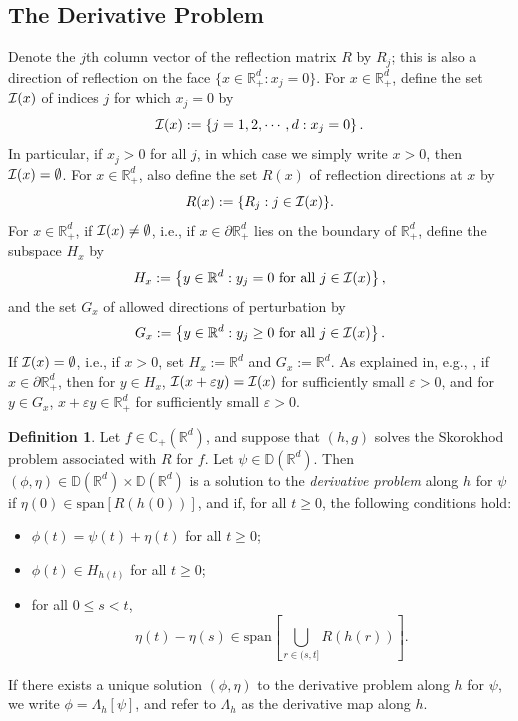 \documentclass[11pt]{article}
\theoremstyle{definition}
\newtheorem{definition}[assumption]{Definition}
\theoremstyle{plain}
\newcommand{\R}{\mathbb{R}}
\newcommand{\C}{\mathbb{C}}
\newcommand{\D}{\mathbb{D}}
\newcommand{\cI}{{\cal I}}
\newcommand{\veps}{\varepsilon}
\begin{document}
\subsection{The Derivative Problem}\label{ssec:deriv-prob}
Denote the $j$th column vector of the reflection matrix $R$ by $R_j$; this is also a direction of reflection on the face $\{x \in \R_+^d : x_j = 0\}$.
For $x \in \R_+^d$, define the set $\cI(x)$ of indices $j$ for which $x_j=0$ by
\begin{equation}
\cI(x) := \left\{j = 1, 2, \cdots, d : x_j = 0\right\}.
\end{equation}
In particular, if $x_j > 0$ for all $j$, in which case we simply write $x>0$, then $\cI(x) = \emptyset$.
For $x \in \R_+^d$, also define the set $R(x)$ of reflection directions at $x$ by
\begin{equation}
R(x) := \{R_j : j \in \cI(x)\}.
\end{equation}
For $x\in \R_+^d$, if $\cI(x) \neq \emptyset$, i.e., if $x \in \partial \R_+^d$ lies on the boundary of $\R_+^d$, 
define the subspace $H_x$ by
\begin{equation}
H_x := \left\{y \in \R^d : y_j = 0 \text{ for all } j \in \cI(x)\right\}, 
\end{equation}
and the set $G_x$ of allowed directions of perturbation by
\begin{equation}
G_x := \left\{y \in \R^d : y_j\geq 0 \text{ for all } j \in \cI(x) \right\}.
\end{equation}
If $\cI(x) = \emptyset$, i.e., if $x > 0$, set $H_x := \R^d$ and $G_x := \R^d$. As explained in, e.g., \cite{LipshutzRamanan2019b}, 
if $x \in \partial \R_+^d$, then for $y \in H_x$, $\cI(x + \veps y) = \cI(x)$ for sufficiently small $\veps>0$, 
and for $y \in G_x$, $x+\veps y \in \R_+^d$ for sufficiently small $\veps>0$.
\begin{definition}\label{df:deriv-prob}
Let \( f \in \C_+(\R^d) \), and suppose that \( (h,g) \) solves the Skorokhod problem associated with \( R \) for \( f \).  
Let \( \psi \in \D(\mathbb{R}^d) \). Then \( (\phi, \eta) \in \D(\mathbb{R}^d)\times \D(\mathbb{R}^d) \) is a solution to the {\em derivative problem} along \( h \) for \( \psi \) if
$\eta(0) \in \text{span} \left[ R(h(0)) \right]$, and if, for all \( t \ge 0 \), the following conditions hold:
\begin{itemize}
  \item[(i)] \( \phi(t) = \psi(t) + \eta(t) \) for all $t \geq 0$;
  \item[(ii)] \( \phi(t) \in H_{h(t)} \) for all $t \geq 0$; 
  \item[(iii)] for all \( 0 \le s < t \),
  \[
  \eta(t) - \eta(s) \in \text{span} \left[ \bigcup_{r \in (s,t]} R(h(r)) \right].
  \]
\end{itemize}
If there exists a unique solution \( (\phi, \eta) \) to the derivative problem along \( h \) for \( \psi \), we write $\phi = \Lambda_h[\psi]$, 
and refer to \( \Lambda_h \) as the derivative map along \( h \).
\end{definition}
\end{document}
